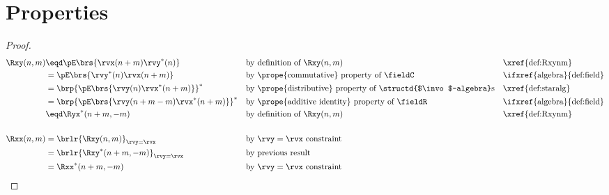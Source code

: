 \section{Properties}
\begin{theorem}
\label{thm:Rxxnm}
\label{thm:Ryynm}
\label{thm:Rxynm}
\end{theorem}
\begin{proof}
\begin{align*}
  \Rxy(n,m)
     &\eqd \pE\brs{\rvx(n+m) \rvy^\ast(n)}
     && \text{by definition of $\Rxy(n,m)$}
     && \text{\xref{def:Rxynm}}
   \\&= \pE\brs{\rvy^\ast(n) \rvx(n+m)}
     && \text{by \prope{commutative} property of $\fieldC$}
     && \text{\ifxref{algebra}{def:field}}
   \\&= \brp{\pE\brs{\rvy(n) \rvx^\ast(n+m)}}^\ast
     && \text{by \prope{distributive} property of \structd{$\invo$-algebra}s}
     && \text{\xref{def:staralg}}
   \\&= \brp{\pE\brs{\rvy(n+m-m) \rvx^\ast(n+m)}}^\ast
     && \text{by \prope{additive identity} property of $\fieldR$}
     && \text{\ifxref{algebra}{def:field}}
   \\&\eqd \Ryx^\ast(n+m,-m)
     && \text{by definition of $\Rxy(n,m)$}
     && \text{\xref{def:Rxynm}}
   \\
   \\
   \Rxx(n,m)
     &= \brlr{\Rxy(n,m)}_{\rvy=\rvx}
     && \text{by $\rvy=\rvx$ constraint}
   \\&= \brlr{\Rxy^\ast(n+m,-m)}_{\rvy=\rvx}
     && \text{by previous result}
   \\&= \Rxx^\ast(n+m,-m)
     && \text{by $\rvy=\rvx$ constraint}
\end{align*}
\end{proof}

